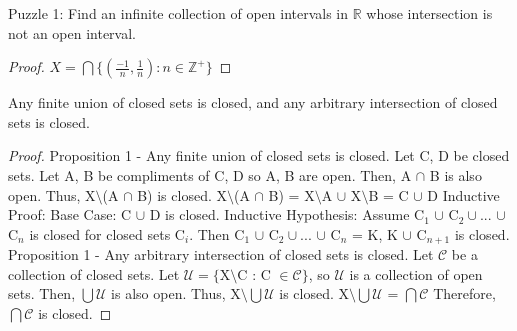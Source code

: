 \documentclass{article}
\begin{document}
	\begin{proposition}
	Puzzle 1: Find an infinite collection of open intervals in $\mathbb{R}$ whose intersection is not an open interval.
	\end{proposition}

	\begin{proof}
	$X = \bigcap\lbrace (\frac{-1}{n}, \frac{1}{n}) : n \in \mathbb{Z}^+\rbrace$
	\end{proof}
  \begin{proposition}
      Any finite union of closed sets is closed, and any arbitrary intersection of closed sets is closed.
  \end{proposition}

  \begin{proof}
  	Proposition 1 - Any finite union of closed sets is closed.
  	\newline
  	Let C, D be closed sets.
  	\newline
  	Let A, B be compliments of C, D so A, B are open.
  	\newline
  	Then, A $\cap$ B is also open.
  	\newline
  	Thus, X$\setminus$(A $\cap$ B) is closed.
  	\newline
  	X$\setminus$(A $\cap$ B) = X$\setminus$A $\cup$ X$\setminus$B = C $\cup$ D
  	\newline\newline
  	Inductive Proof:
  	\newline
  	Base Case: C $\cup$ D is closed.
  	\newline
  	Inductive Hypothesis:
  	\newline
  	Assume C$_1$ $\cup $ C$_2 \cup ...$ $\cup $ C$_n$ is closed for closed sets C$_i$.
  	\newline
	Then C$_1$ $\cup $ C$_2 \cup ...$ $\cup $ C$_n$ = K, K $\cup$ C$_{n+1}$ is closed.
  	\newline\newline
  	Proposition 1 - Any arbitrary intersection of closed sets is closed.
  	\newline
  	Let $\mathcal{C}$ be a collection of closed sets.
  	\newline
  	Let $\mathcal{U} = \lbrace$X$\setminus$C : C $\in \mathcal{C}\rbrace$, so $\mathcal{U}$ is a collection of open sets.
  	\newline
  	Then, $\bigcup \mathcal{U}$ is also open.
  	\newline
  	Thus, X$\setminus\bigcup\mathcal{U}$ is closed.
  	\newline
  	X$\setminus\bigcup\mathcal{U}$ = $\bigcap\mathcal{C}$
  	\newline
  	Therefore, $\bigcap\mathcal{C}$ is closed.
	\end{proof}
\end{document}

